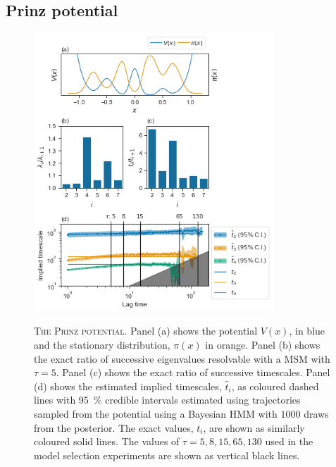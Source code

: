 \subsection{Prinz potential}
\begin{figure}[p]
    \centering
    \caption[The Prinz potential]{\textsc{The Prinz potential}. Panel (a) shows the potential $V(x)$, in blue and the stationary distribution, $\pi(x)$ in orange. Panel (b) shows the exact ratio of successive eigenvalues resolvable with a MSM with $\tau=5$. Panel (c) shows the exact ratio of successive timescales. Panel (d) shows the estimated implied timescales, $\hat{t}_{i}$, as coloured dashed lines with \SI{95}{\percent} credible intervals estimated using trajectories sampled from the potential using a Bayesian HMM with $1000$ draws from the posterior. The exact values, $t_{i}$, are shown as similarly coloured solid lines. The values of $\tau = 5, 8, 15, 65, 130$ used in the model selection experiments are shown as vertical black lines.}
    \includegraphics[width=0.8\textwidth]{chapters/hmm_selection/figures/prinz_pot.png}
    \label{fig:prinz_pot}
\end{figure}

